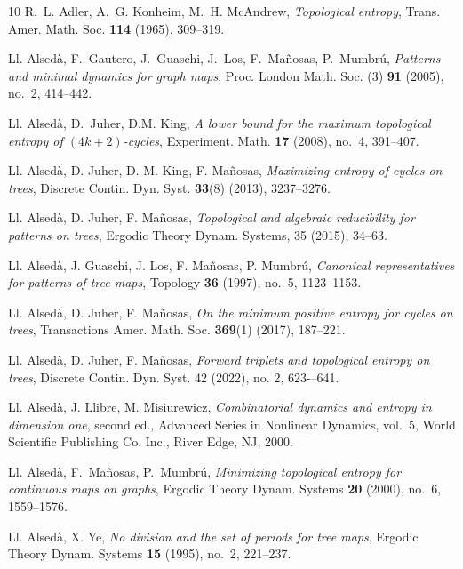 \documentclass[a4paper]{amsart}
\theoremstyle{definition}
\begin{document}
\begin{thebibliography}{10}
R.~L. Adler, A.~G. Konheim, M.~H. McAndrew, \emph{Topological entropy},
  Trans. Amer. Math. Soc. \textbf{114} (1965), 309--319. 

Ll. Alsed{\`a}, F.~Gautero, J.~Guaschi, J.~Los, F.~Ma{\~n}osas, P.~Mumbr{\'u},
\emph{Patterns and minimal dynamics for graph maps},
Proc. London Math. Soc. (3) \textbf{91} (2005), no.~2, 414--442.

Ll. Alsed{\`a}, D.~Juher, D.M. King, \emph{A lower bound for the maximum topological
entropy of {$(4k+2)$}-cycles}, Experiment. Math. \textbf{17} (2008), no.~4, 391--407.

Ll. Alsedà, D. Juher, D. M. King, F. Mañosas, \emph{Maximizing entropy of cycles on trees},
Discrete Contin. Dyn. Syst. {\bf 33}(8) (2013), 3237--3276.

Ll. Alsed\`{a}, D. Juher, F. Ma\~{n}osas, \emph{Topological and algebraic
reducibility for patterns on trees}, Ergodic Theory Dynam. Systems, 35 (2015), 34--63.

Ll. Alsed\`{a}, J. Guaschi, J. Los, F. Ma\~{n}osas, P. Mumbr\'{u}, \emph{Canonical representatives for
  patterns of tree maps}, Topology \textbf{36} (1997), no.~5, 1123--1153.

Ll. Alsed\`{a}, D. Juher, F. Ma\~nosas, \emph{On the minimum positive entropy for cycles on trees},
Transactions Amer. Math. Soc. {\bf 369}(1) (2017), 187--221.

Ll. Alsed\`a, D. Juher, F.  Ma\~{n}osas, \emph{Forward triplets and topological entropy on trees},
Discrete Contin. Dyn. Syst. 42 (2022), no. 2, 623-–641.

Ll. Alsed\`{a}, J. Llibre, M. Misiurewicz,
  \emph{Combinatorial dynamics and entropy in dimension one}, second ed.,
  Advanced Series in Nonlinear Dynamics, vol.~5, World Scientific Publishing
  Co. Inc., River Edge, NJ, 2000. 

Ll. Alsed{\`a}, F.~Ma{\~n}osas, P.~Mumbr{\'u}, \emph{Minimizing
topological entropy for continuous maps on graphs}, Ergodic Theory Dynam.
Systems \textbf{20} (2000), no.~6, 1559--1576.

Ll. Alsed\`{a}, X. Ye, \emph{No division and the
set of   periods for tree maps}, Ergodic Theory Dynam. Systems
\textbf{15} (1995), no.~2, 221--237. 


\end{thebibliography}
\end{document}
